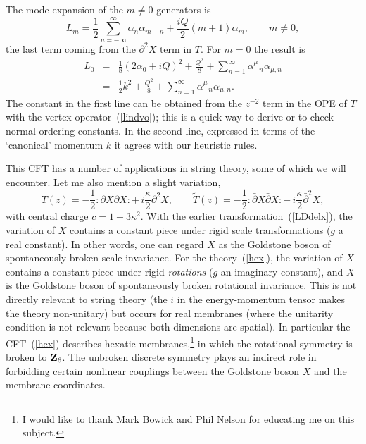 The mode expansion of the $m \neq 0$ generators is
\begin{equation}
L_m = \frac{1}{2} \sum_{n=-\infty}^\infty \alpha_n \alpha_{m-n}
+ \frac{i Q}{2} (m+1) \alpha_m ,
\qquad m \neq 0,
\end{equation}
the last term coming from the $\partial^2 X$ term in $T$.
For $m=0$ the result is
\begin{eqnarray}
L_0 &=& 
\frac{1}{8} (2\alpha_0 + iQ)^2 
+ \frac{Q^2}{8} + \sum_{n=1}^\infty \alpha^\mu_{-n} \alpha_{\mu,n} 
\nonumber\\
&=& \frac{1}{2} k^2 
+ \frac{Q^2}{8} + \sum_{n=1}^\infty \alpha^\mu_{-n} \alpha_{\mu,n} .
\end{eqnarray}
The constant in the first line can be obtained from the
$z^{-2}$ term in the OPE of $T$
with the vertex operator~(\ref{lindvo}); this is a quick way to
derive or to check normal-ordering constants.  In the second line,
expressed in terms of the `canonical' momentum $k$ it agrees
with our heuristic rules.

This CFT has a number of applications in string theory, some
of which we will encounter.  Let me also mention a slight variation,
\begin{equation}
T(z) = -\frac{1}{2} :\! \partial X \partial X \! : +\,
i\frac{\kappa}{2} \partial^2 X, \qquad
\tilde T(\bar z) = -\frac{1}{2} :\! \bar\partial X
\bar\partial X \! : -\, i\frac{\kappa}{2} \bar\partial^2 X,
\label{hex}
\end{equation}
with central charge $c = 1 - 3 \kappa^2$.  With the earlier
transformation~(\ref{LDdelx}), the variation of $X$
contains a constant piece under rigid scale transformations ($g$ a
real constant).  In other words, one can regard $X$ as the
Goldstone boson of spontaneously broken scale invariance.  For the
theory~(\ref{hex}), the variation of $X$
contains a constant piece under rigid {\it rotations} ($g$ an
imaginary constant), and $X$ is the
Goldstone boson of spontaneously broken rotational invariance.
This is not directly relevant to string theory (the $i$ in the
energy-momentum tensor makes the theory non-unitary) but occurs for
real membranes (where the unitarity condition is not relevant
because both dimensions are spatial).  In particular the
CFT~(\ref{hex}) describes hexatic membranes,\footnote
{I would like to thank Mark Bowick and Phil Nelson for educating me
on this subject.} in which the rotational
symmetry is broken to ${\bf Z}_6$.  The unbroken discrete symmetry
plays an indirect role in forbidding certain nonlinear couplings
between the Goldstone boson $X$ and the membrane
coordinates.

